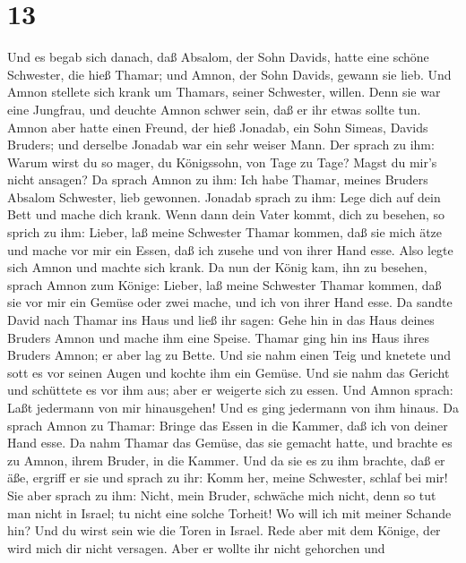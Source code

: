 \hypertarget{section-12}{%
\section{13}\label{section-12}}

 Und es begab sich danach, daß Absalom, der Sohn Davids,
hatte eine schöne Schwester, die hieß Thamar; und Amnon, der Sohn
Davids, gewann sie lieb.  Und Amnon stellete sich krank um
Thamars, seiner Schwester, willen. Denn sie war eine Jungfrau, und
deuchte Amnon schwer sein, daß er ihr etwas sollte tun. 
Amnon aber hatte einen Freund, der hieß Jonadab, ein Sohn Simeas, Davids
Bruders; und derselbe Jonadab war ein sehr weiser Mann.  Der
sprach zu ihm: Warum wirst du so mager, du Königssohn, von Tage zu Tage?
Magst du mir's nicht ansagen? Da sprach Amnon zu ihm: Ich habe Thamar,
meines Bruders Absalom Schwester, lieb gewonnen.  Jonadab
sprach zu ihm: Lege dich auf dein Bett und mache dich krank. Wenn dann
dein Vater kommt, dich zu besehen, so sprich zu ihm: Lieber, laß meine
Schwester Thamar kommen, daß sie mich ätze und mache vor mir ein Essen,
daß ich zusehe und von ihrer Hand esse.  Also legte sich
Amnon und machte sich krank. Da nun der König kam, ihn zu besehen,
sprach Amnon zum Könige: Lieber, laß meine Schwester Thamar kommen, daß
sie vor mir ein Gemüse oder zwei mache, und ich von ihrer Hand esse.
 Da sandte David nach Thamar ins Haus und ließ ihr sagen:
Gehe hin in das Haus deines Bruders Amnon und mache ihm eine Speise.
 Thamar ging hin ins Haus ihres Bruders Amnon; er aber lag
zu Bette. Und sie nahm einen Teig und knetete und sott es vor seinen
Augen und kochte ihm ein Gemüse.  Und sie nahm das Gericht
und schüttete es vor ihm aus; aber er weigerte sich zu essen. Und Amnon
sprach: Laßt jedermann von mir hinausgehen! Und es ging jedermann von
ihm hinaus.  Da sprach Amnon zu Thamar: Bringe das Essen in
die Kammer, daß ich von deiner Hand esse. Da nahm Thamar das Gemüse, das
sie gemacht hatte, und brachte es zu Amnon, ihrem Bruder, in die Kammer.
 Und da sie es zu ihm brachte, daß er äße, ergriff er sie
und sprach zu ihr: Komm her, meine Schwester, schlaf bei mir!
 Sie aber sprach zu ihm: Nicht, mein Bruder, schwäche mich
nicht, denn so tut man nicht in Israel; tu nicht eine solche Torheit!
 Wo will ich mit meiner Schande hin? Und du wirst sein wie
die Toren in Israel. Rede aber mit dem Könige, der wird mich dir nicht
versagen.  Aber er wollte ihr nicht gehorchen und
